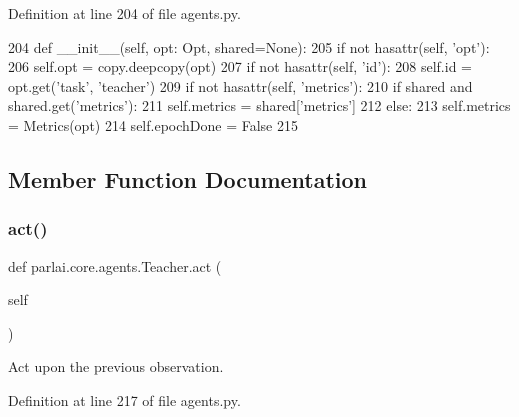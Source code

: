 Definition at line 204 of file agents.\+py.


\begin{DoxyCode}
204     \textcolor{keyword}{def }\_\_init\_\_(self, opt: Opt, shared=\textcolor{keywordtype}{None}):
205         \textcolor{keywordflow}{if} \textcolor{keywordflow}{not} hasattr(self, \textcolor{stringliteral}{'opt'}):
206             self.opt = copy.deepcopy(opt)
207         \textcolor{keywordflow}{if} \textcolor{keywordflow}{not} hasattr(self, \textcolor{stringliteral}{'id'}):
208             self.id = opt.get(\textcolor{stringliteral}{'task'}, \textcolor{stringliteral}{'teacher'})
209         \textcolor{keywordflow}{if} \textcolor{keywordflow}{not} hasattr(self, \textcolor{stringliteral}{'metrics'}):
210             \textcolor{keywordflow}{if} shared \textcolor{keywordflow}{and} shared.get(\textcolor{stringliteral}{'metrics'}):
211                 self.metrics = shared[\textcolor{stringliteral}{'metrics'}]
212             \textcolor{keywordflow}{else}:
213                 self.metrics = Metrics(opt)
214         self.epochDone = \textcolor{keyword}{False}
215 
\end{DoxyCode}


\subsection{Member Function Documentation}
\mbox{\label{classparlai_1_1core_1_1agents_1_1Teacher_a3f4cbdfdddddb8776ab665f5f7ee63d6}} 
\subsubsection{\texorpdfstring{act()}{act()}}
{\footnotesize\ttfamily def parlai.\+core.\+agents.\+Teacher.\+act (\begin{DoxyParamCaption}\item[{}]{self }\end{DoxyParamCaption})}

\begin{DoxyVerb}Act upon the previous observation.
\end{DoxyVerb}
 

Definition at line 217 of file agents.\+py.


